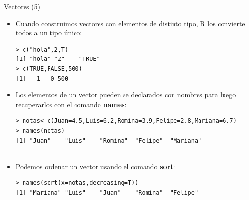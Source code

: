 \documentclass[handout]{beamer}
\begin{document}
 
\begin{frame}[fragile]{Vectores (5)}
\scriptsize{
\begin{itemize}
 
\item Cuando construimos vectores con elementos de distinto tipo, R los convierte todos a un tipo único:
\begin{verbatim}
> c("hola",2,T)
[1] "hola" "2"    "TRUE"
> c(TRUE,FALSE,500)
[1]   1   0 500 
\end{verbatim}

 \item Los elementos de un vector pueden se declarados con nombres para luego recuperarlos con el comando \textbf{names}:
\begin{verbatim}
> notas<-c(Juan=4.5,Luis=6.2,Romina=3.9,Felipe=2.8,Mariana=6.7)
> names(notas)
[1] "Juan"    "Luis"    "Romina"  "Felipe"  "Mariana"
 
\end{verbatim}
\item Podemos ordenar un vector usando el comando \textbf{sort}:
\begin{verbatim}
> names(sort(x=notas,decreasing=T))
[1] "Mariana" "Luis"    "Juan"    "Romina"  "Felipe" 
\end{verbatim}

\end{itemize}



}
\end{frame}
\end{document}
